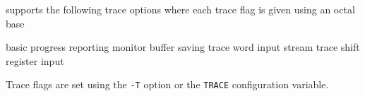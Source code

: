 
 supports the following trace options where each trace flag is 
given using an octal base
\begin{optlist}
    basic progress reporting
    monitor buffer saving
    trace word input stream
    trace shift register input
\end{optlist}
Trace flags are set using the \texttt{-T} option or the \texttt{TRACE}
configuration variable.
